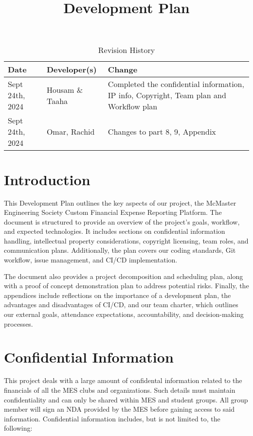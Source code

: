 \documentclass{article}
\title{Development Plan\\\progname}
\author{\authname}
\date{}
\begin{document}
\maketitle

\begin{table}[hp]
\caption{Revision History} \label{TblRevisionHistory}
\begin{tabularx}{\textwidth}{llX}
\toprule
\textbf{Date} & \textbf{Developer(s)} & \textbf{Change}\\
\midrule
Sept 24th, 2024 & Housam \& Taaha & Completed the confidential information, IP info, Copyright, Team plan and Workflow plan \\
Sept 24th, 2024 & Omar, Rachid & Changes to part 8, 9, Appendix\\
\bottomrule
\end{tabularx}
\end{table}

\newpage{}

\section*{Introduction}

This Development Plan outlines the key aspects of our project, the McMaster Engineering Society Custom Financial Expense Reporting Platform. The document is structured to provide an overview of the project's goals, workflow, and expected technologies. It includes sections on confidential information handling, intellectual property considerations, copyright licensing, team roles, and communication plans. Additionally, the plan covers our coding standards, Git workflow, issue management, and CI/CD implementation. 

The document also provides a project decomposition and scheduling plan, along with a proof of concept demonstration plan to address potential risks. Finally, the appendices include reflections on the importance of a development plan, the advantages and disadvantages of CI/CD, and our team charter, which outlines our external goals, attendance expectations, accountability, and decision-making processes.

\section{Confidential Information}
This project deals with a large amount of confidental information related to the financials of all the MES clubs and organizations. Such details must maintain confidentiality and can only be shared within MES and student groups. All group member will sign an NDA provided by the MES before gaining access to said information. Confidential information includes, but is not limited to, the following:
\end{document}
